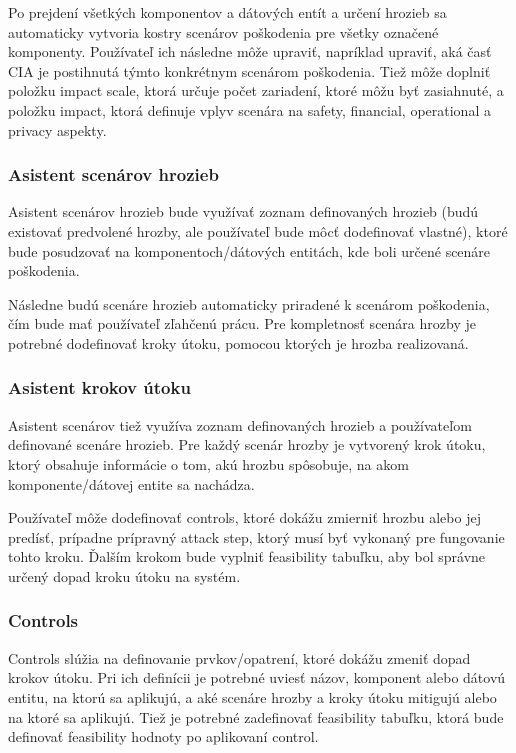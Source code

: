 \documentclass[11pt]{article}
\begin{document}
Po prejdení všetkých komponentov a dátových entít a určení hrozieb sa automaticky vytvoria kostry scenárov poškodenia pre všetky označené komponenty.
Používateľ ich následne môže upraviť, napríklad upraviť, aká časť CIA je postihnutá týmto konkrétnym scenárom poškodenia.
Tiež môže doplniť položku impact scale, ktorá určuje počet zariadení, ktoré môžu byť zasiahnuté, a položku impact, ktorá definuje vplyv scenára na safety, financial, operational a privacy aspekty.

\subsubsection{Asistent scenárov hrozieb}
Asistent scenárov hrozieb bude využívať zoznam definovaných hrozieb (budú existovať predvolené hrozby, ale používateľ bude môcť dodefinovať vlastné), ktoré bude posudzovať na komponentoch/dátových entitách, kde boli určené scenáre poškodenia.

Následne budú scenáre hrozieb automaticky priradené k scenárom poškodenia, čím bude mať používateľ zľahčenú prácu.
Pre kompletnosť scenára hrozby je potrebné dodefinovať kroky útoku, pomocou ktorých je hrozba realizovaná.

\subsubsection{Asistent krokov útoku}
Asistent scenárov tiež využíva zoznam definovaných hrozieb a používateľom definované scenáre hrozieb.
Pre každý scenár hrozby je vytvorený krok útoku, ktorý obsahuje informácie o tom, akú hrozbu spôsobuje, na akom komponente/dátovej entite sa nachádza.

Používateľ môže dodefinovať controls, ktoré dokážu zmierniť hrozbu alebo jej predísť, prípadne prípravný attack step, ktorý musí byť vykonaný pre fungovanie tohto kroku.
Ďalším krokom bude vyplniť feasibility tabuľku, aby bol správne určený dopad kroku útoku na systém.

\subsubsection{Controls}
Controls slúžia na definovanie prvkov/opatrení, ktoré dokážu zmeniť dopad krokov útoku.
Pri ich definícii je potrebné uviesť názov, komponent alebo dátovú entitu, na ktorú sa aplikujú, a aké scenáre hrozby a kroky útoku mitigujú alebo na ktoré sa aplikujú.
Tiež je potrebné zadefinovať feasibility tabuľku, ktorá bude definovať feasibility hodnoty po aplikovaní control.
\end{document}
